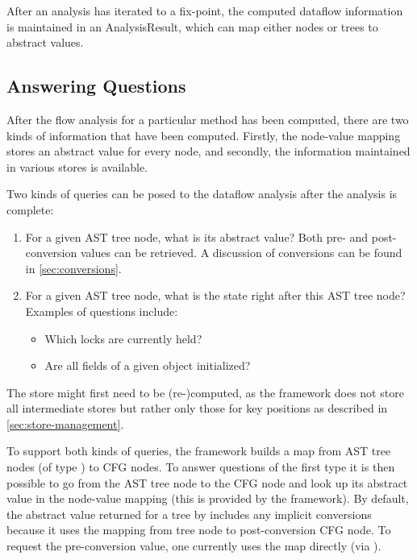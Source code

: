 After an analysis has iterated to a fix-point, the computed dataflow
information is maintained in an AnalysisResult, which can map either
nodes or trees to abstract values.


\subsection{Answering Questions}
\label{sec:answering-questions}
After the flow analysis for a particular method has been computed,
there are two kinds of information that have been computed.  Firstly,
the node-value mapping stores an abstract value for every node, and
secondly, the information maintained in various stores is available.

Two kinds of queries can be posed to the dataflow analysis after the
analysis is complete:
\begin{enumerate}
    \item For a given AST tree node, what is its abstract value?  Both
      pre- and post-conversion values can be retrieved.
      A discussion of conversions can be found in \autoref{sec:conversions}.
    \item For a given AST tree node, what is the state right after
      this AST tree node?  Examples of questions include:
    \begin{itemize}
        \item Which locks are currently held?
        \item Are all fields of a given object initialized?
    \end{itemize}
\end{enumerate}

The store might first need to be (re-)computed, as the framework does not
store all intermediate stores but rather only those for key positions
as described in \autoref{sec:store-management}.

To support both kinds of queries, the framework builds a map from AST
tree nodes (of type ) to CFG nodes.  To
answer questions of the first type it is then possible to go from the
AST tree node to the CFG node and look up its abstract value in the
node-value mapping (this is provided by the framework).  By default,
the abstract value returned for a tree by
 includes any implicit conversions
because it uses the mapping from tree node to post-conversion CFG
node.  To request the pre-conversion value, one currently uses the
 map directly (via
).

